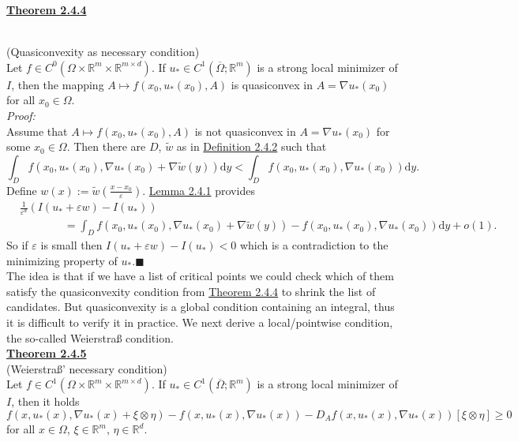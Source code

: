 \hypertarget{theorem_2_4_4}{\textbf{\underline{Theorem 2.4.4}}}\\
(Quasiconvexity as necessary condition)\\
Let $f\in C^0(\Omega\times\mathbb{R}^m\times\mathbb{R}^{m\times d})$. If $u_*\in C^1(\overline{\Omega};\mathbb{R}^m)$ is a strong local minimizer of $I$, then the mapping $A\longmapsto f(x_0,u_*(x_0),A)$ is quasiconvex in $A=\nabla u_*(x_0)$ for all $x_0\in\Omega$.\\

\textit{Proof:}\\
Assume that $A\longmapsto f(x_0,u_*(x_0),A)$ is not quasiconvex in $A=\nabla u_*(x_0)$ for some $x_0\in\Omega$. Then there are $D$, $\widetilde{w}$ as in \hyperlink{definition_2_4_2}{Definition 2.4.2} such that
\[\int_D{f(x_0,u_*(x_0),\nabla u_*(x_0)+\nabla\widetilde{w}(y))\mathrm{d}y}<\int_D{f(x_0,u_*(x_0),\nabla u_*(x_0))\mathrm{d}y}.\]
Define $w(x):=\widetilde{w}\left(\frac{x-x_0}{\varepsilon}\right)$. \hyperlink{lemma_2_4_1}{Lemma 2.4.1} provides
\begin{align*}
	&\frac{1}{\varepsilon^d}\left(I(u_*+\varepsilon w)-I(u_*)\right)\\
	&\qquad\qquad=\int_D{f(x_0,u_*(x_0),\nabla u_*(x_0)+\nabla\widetilde{w}(y))-f(x_0,u_*(x_0),\nabla u_*(x_0))\mathrm{d}y}+o(1).
\end{align*}
So if $\varepsilon$ is small then $I(u_*+\varepsilon w)-I(u_*)<0$ which is a contradiction to the minimizing property of $u_*$.\hfill$\blacksquare$\\[11pt]

The idea is that if we have a list of critical points we could check which of them satisfy the quasiconvexity condition from \hyperlink{theorem_2_4_4}{Theorem 2.4.4} to shrink the list of candidates. But quasiconvexity is a global condition containing an integral, thus it is difficult to verify it in practice. We next derive a local/pointwise condition, the so-called Weierstra{\ss} condition.\\[11pt]

\hypertarget{theorem_2_4_5}{\textbf{\underline{Theorem 2.4.5}}}\\
(Weierstra{\ss}' necessary condition)\\
Let $f\in C^1(\Omega\times\mathbb{R}^m\times\mathbb{R}^{m\times d})$. If $u_*\in C^1(\overline{\Omega};\mathbb{R}^m)$ is a strong local minimizer of $I$, then it holds
\[f(x,u_*(x),\nabla u_*(x)+\xi\otimes\eta)-f(x,u_*(x),\nabla u_*(x))-D_Af(x,u_*(x),\nabla u_*(x))[\xi\otimes\eta]\geq0\]
for all $x\in\Omega$, $\xi\in\mathbb{R}^m$, $\eta\in\mathbb{R}^d$.\\[11pt]

